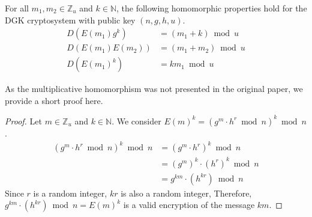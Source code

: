 

For all $m_1,m_2 \in \mathbb{Z}_u$ and $k\in \mathbb{N}$, the following homomorphic properties hold for the DGK cryptosystem with public key $(n,g,h,u)$.
\begin{align*}
    D(E(m_1)g^k) &=(m_1+k)\bmod u\\
    D(E(m_1)E(m_2)) &=(m_1+m_2)\bmod u\\
    D(E(m_1)^k) &= km_1\bmod u
\end{align*}

As the multiplicative homomorphism was not presented in the original paper, we provide a short proof here.
\begin{proof}
  Let $m \in \mathbb{Z}_u$ and $k\in \mathbb{N}$.
  We consider $E(m)^k = (g^m \cdot h^r \bmod{n})^k\bmod n$.
  \begin{align*}
    (g^m \cdot h^r \bmod{n})^k \bmod n
    &= (g^m \cdot h^r)^k \bmod{n}\\
    &= (g^m)^k \cdot (h^r)^k \bmod{n}\\
    &= g^{km} \cdot (h^{kr}) \bmod{n}
  \end{align*}
  Since $r$ is a random integer, $kr$ is also a random integer, Therefore, $g^{km} \cdot (h^{kr}) \bmod{n} = E(m)^k$ is a valid encryption of the message $km$.
\end{proof}



